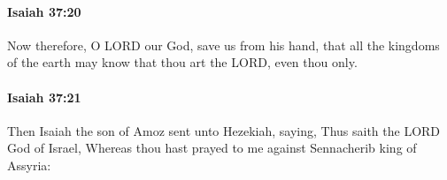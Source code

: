 		\paragraph{Isaiah 37:20} %
			\label{ISAIAH-37-20}

			Now therefore, O LORD our God, save us from his hand, that all the kingdoms of the earth may know that thou art the LORD, even thou only.


		\paragraph{Isaiah 37:21} %
			\label{ISAIAH-37-21}

			Then Isaiah the son of Amoz sent unto Hezekiah, saying, Thus saith the LORD God of Israel, Whereas thou hast prayed to me against Sennacherib king of Assyria:


